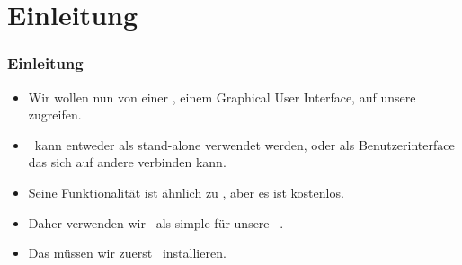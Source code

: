 \documentclass[aspectratio=169,mathserif,notheorems]{beamer}%
\subtitle{17.~LibreOffice Installieren}%
\begin{document}
%
%
\startPresentation%
%
\section{Einleitung}%
%
\begin{frame}[t]%
\frametitle{Einleitung}%
%
\begin{itemize}%
\item Wir wollen nun von einer , einem Graphical User Interface, auf unsere  zugreifen.%
%
\item<2-> \libreofficeBase\ kann entweder als stand-alone  verwendet werden, oder als Benutzerinterface das sich auf andere  verbinden kann\cite{FNFHWSKLSSGLFRSRPLJG2022BG7R1BOL7C,S2022L7PFEUU}.%
%
\item<3-> Seine Funktionalität ist ähnlich zu \microsoftAccess\cite{SSI2023MA2BTA,B2020HOMA2,UC2021AFD}, aber es ist kostenlos.%
%
\item<4-> Daher verwenden wir \libreofficeBase\ als simple  für unsere \postgresql\ .%
%
\item<5-> Das müssen wir zuerst \libreoffice\ installieren.
\end{itemize}%
%
%
\end{frame}%
%
%
\end{document}
